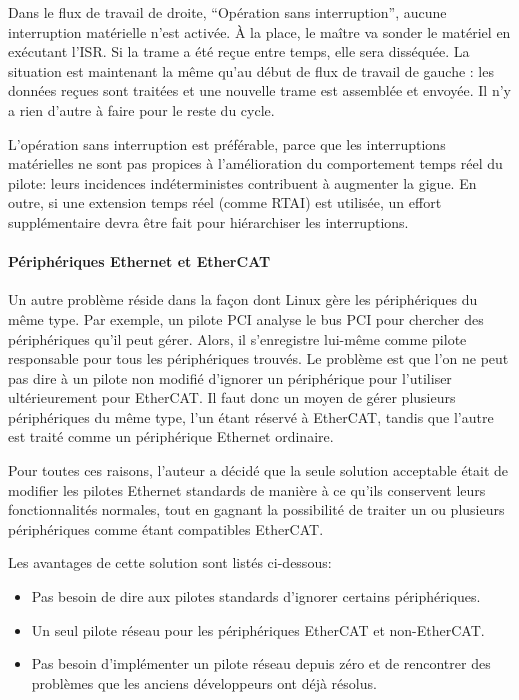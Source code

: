 \documentclass[a4paper,12pt,BCOR=6mm,bibtotoc,idxtotoc]{scrbook}
\begin{document}
Dans le flux de travail de droite, ``Op\'eration sans interruption'',
aucune interruption mat\'erielle n'est activ\'ee. \`A la place, le
ma\^itre va sonder le mat\'eriel en ex\'ecutant l'ISR. Si la trame a
\'et\'e re\c{c}ue entre temps, elle sera diss\'equ\'ee. La situation est
maintenant la m\^eme qu'au d\'ebut de flux de travail de gauche : les
donn\'ees re\c{c}ues sont trait\'ees et une nouvelle trame est
assembl\'ee et envoy\'ee. Il n'y a rien d'autre \`a faire pour le
reste du cycle.

L'op\'eration sans interruption est pr\'ef\'erable, parce que les
interruptions mat\'erielles ne sont pas propices \`a l'am\'elioration
du comportement temps r\'eel du pilote: leurs incidences
ind\'eterministes contribuent \`a augmenter la gigue. En outre, si une
extension temps r\'eel (comme RTAI) est utilis\'ee, un effort
suppl\'ementaire devra \^etre fait pour hi\'erarchiser les
interruptions.

\paragraph{P\'eriph\'eriques Ethernet et EtherCAT}
Un autre probl\`eme r\'eside dans la fa\c{c}on dont Linux g\`ere les
p\'eriph\'eriques du m\^eme type.  Par exemple, un pilote
PCI analyse le bus PCI pour chercher des p\'eriph\'eriques
qu'il peut g\'erer.  Alors, il s'enregistre lui-m\^eme comme pilote
responsable pour tous les p\'eriph\'eriques trouv\'es.  Le probl\`eme
est que l'on ne peut pas dire \`a un pilote non modifi\'e d'ignorer un
p\'eriph\'erique pour l'utiliser ult\'erieurement pour EtherCAT. Il
faut donc un moyen de g\'erer plusieurs p\'eriph\'eriques du m\^eme
type, l'un \'etant r\'eserv\'e \`a EtherCAT, tandis que l'autre est
trait\'e comme un p\'eriph\'erique Ethernet ordinaire.

Pour toutes ces raisons, l'auteur a d\'ecid\'e que la seule solution
acceptable \'etait de modifier les pilotes Ethernet standards de
mani\`ere \`a ce qu'ils conservent leurs fonctionnalit\'es normales,
tout en gagnant la possibilit\'e de traiter un ou plusieurs
p\'eriph\'eriques comme \'etant compatibles EtherCAT.

Les avantages de cette solution sont list\'es ci-dessous:

\begin{itemize}
\item Pas besoin de dire aux pilotes standards d'ignorer certains
  p\'eriph\'eriques.
\item Un seul pilote r\'eseau pour les p\'eriph\'eriques EtherCAT et
  non-EtherCAT.
\item Pas besoin d'impl\'ementer un pilote r\'eseau depuis z\'ero et
  de rencontrer des probl\`emes que les anciens d\'eveloppeurs ont
  d\'ej\`a r\'esolus.
\end{itemize}
\end{document}
